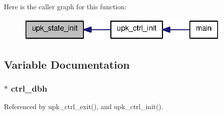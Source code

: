 Here is the caller graph for this function:
\nopagebreak
\begin{figure}[H]
\begin{center}
\leavevmode
\includegraphics[width=302pt]{controller_2controller_8c_aaf41ef9b8673a7296600046af83c2787_icgraph}
\end{center}
\end{figure}




\subsection{Variable Documentation}
\subsubsection[{ctrl\_\-dbh}]{$\ast$ {\bf ctrl\_\-dbh}}\label{controller_2controller_8c_ab907e74d7ad6a0a44e7c050fdad06b33}


Referenced by upk\_\-ctrl\_\-exit(), and upk\_\-ctrl\_\-init().

